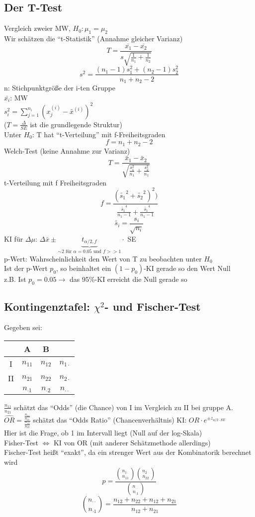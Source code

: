 \documentclass[10pt,a4paper]{article}
\theoremstyle{definition}
\begin{document}
\subsection{Der T-Test}
Vergleich zweier MW, $H_0: \mu_1 = \mu_2$ \\
Wir schätzen die ``t-Statistik'' (Annahme gleicher Varianz) \\
\[ T = \frac{\bar{x_1} - \bar{x_2}}{s \sqrt{\frac{1}{n_1} + \frac{1}{n_2}}} \]
\[ s^2 = \frac{(n_1 - 1) s_1^2 + (n_2 -1) s_2^2}{n_1 + n_2 -2} \]
n: Stichpunktgröße der i-ten Gruppe \\
$\bar{x_i}$: MW \\
$s_i^2 = \sum\limits_{j=1}^{n_i} (x_j^{(i)} - \bar{x}^{(i)} )^2 $ \\
($T = \frac{\Delta}{SE}$ ist die grundlegende Struktur) \\
Unter $H_0$: T hat ``t-Verteilung'' mit f-Freiheitsgraden
\[ f= n_1 + n_2 -2 \]
Welch-Test (keine Annahme zur Varianz) \\
\[ T = \frac{\bar{x}_1 - \bar{x}_2 }{\sqrt{\frac{s_1^2}{n_1} + \frac{s_2^2}{n_1}}} \]
t-Verteilung mit f Freiheitsgraden
\[ f=\frac{(\tilde{s_1}^2 + \tilde{s_2}^2)^2)}{\frac{\tilde{s_1}^4}{n_1 - 1} + \frac{\tilde{s_1}^4}{n_1 - 1}} \]
\[ \tilde{s_i} = \frac{s_i}{\sqrt{n_i}} \]
KI für $\Delta \mu$: $\Delta \bar{x} \pm \underbrace{t_{\alpha / 2 , f}}_{\sim 2 \text{ für } \alpha=0.05 \text{ und } f >> 1}  \cdot$ SE \\
p-Wert: Wahrscheinlichkeit den Wert von T zu beobachten unter $H_0$ \\
Ist der p-Wert $p_0$, so beinhaltet ein $(1-p_0)$-KI gerade so den Wert Null \\
z.B. Ist $p_0=0.05 \rightarrow$ das 95\%-KI erreicht die Null gerade so

\subsection{Kontingenztafel: $\chi^2$- und Fischer-Test}
Gegeben sei:
\begin{tabular}{c|c|c|c}
 & A & B \\ \hline
 I & $n_{11}$ & $n_{12}$ & $n_{1\cdot}$ \\ \hline
 II & $n_{21}$ & $n_{22}$ & $n_{2\cdot}$ \\ \hline
  & $n_{\cdot1}$ & $n_{\cdot2}$ & $n_{\cdot\cdot}$
\end{tabular}
\newline
$\frac{n_{11}}{n_{21}}$ schätzt das ``Odds'' (die Chance) von I im Vergleich zu II bei gruppe A. $\widehat{OR}=\frac{\frac{n_{11}}{n_{21}}}{\frac{n_{12}}{n_{22}}}$ schätzt das ``Odds Ratio'' (Chancenverhältnis) KI: $OR \cdot e^{\pm z_{a/2 \cdot SE}}$ \\
Hier ist die Frage, ob 1 im Intervall liegt (Null auf der log-Skala)\\
 Fisher-Test $\Leftrightarrow$ KI von OR (mit anderer Schätzmethode allerdings)  \\
Fischer-Test heißt ``exakt'', da ein strenger Wert aus der Kombinatorik berechnet wird
\[ p = \frac{\binom{n_{1\cdot}}{n_{11}} \binom{n_{2\cdot}}{n_{22}}}{ \binom{n_{\cdot \cdot}}{n_{\cdot1}}} \]
\[ \binom{n_{\cdot\cdot}}{n_{\cdot1}} = \frac{n_{12} + n_{22} + n_{12} + n_{21} }{n_{12} + n_{21} } \]
\end{document}
